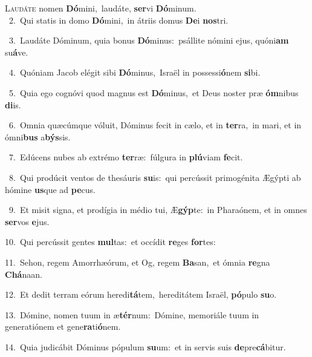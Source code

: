 \lettrine{\initial\textcolor{\initialcolor}{L}}{audáte} nomen \textbf{Dó}\-mini,~\star laudáte, \textbf{ser}\-vi \textbf{Dó}\-minum.\\
{\numbfont\textcolor{\numbcolor}{~2.}}~Qui statis in domo \textbf{Dó}\-mini,~\star in átriis domus \textbf{De}\-i \textbf{nos}\-tri.\par
{\numbfont\textcolor{\numbcolor}{~3.}}~Laudáte Dóminum, quia bonus \textbf{Dó}\-minus:~\star psállite nómini ejus, quóni\textbf{am} su\-\textbf{á}\-ve.\par
{\numbfont\textcolor{\numbcolor}{~4.}}~Quóniam Jacob elégit sibi \textbf{Dó}\-minus,~\star Israël in possessi\-\textbf{ó}\-nem \textbf{si}\-bi.\par
{\numbfont\textcolor{\numbcolor}{~5.}}~Quia ego cognóvi quod magnus est \textbf{Dó}\-minus,~\star et Deus noster præ \textbf{óm}\-nibus \textbf{di}\-is.\par
{\numbfont\textcolor{\numbcolor}{~6.}}~Omnia quæcúmque vóluit, Dóminus fecit in cælo, et in \textbf{ter}\-ra,~\star in mari, et in ómni\textbf{bus} a\-\textbf{býs}\-sis.\par
{\numbfont\textcolor{\numbcolor}{~7.}}~Edúcens nubes ab extrémo \textbf{ter}\-ræ:~\star fúlgura in \textbf{plú}\-viam \textbf{fe}\-cit.\par
{\numbfont\textcolor{\numbcolor}{~8.}}~Qui prodúcit ventos de thesáuris \textbf{su}\-is:~\star qui percússit primogénita Ægýpti ab hómine \textbf{us}\-que ad \textbf{pe}\-cus.\par
{\numbfont\textcolor{\numbcolor}{~9.}}~Et misit signa, et prodígia in médio tui, Æ\-\textbf{gýp}\-te:~\star in Pharaónem, et in omnes \textbf{ser}\-vos \textbf{e}\-jus.\par
{\numbfont\textcolor{\numbcolor}{10.}}~Qui percússit gentes \textbf{mul}\-tas:~\star et occídit \textbf{re}\-ges \textbf{for}\-tes:\par
{\numbfont\textcolor{\numbcolor}{11.}}~Sehon, regem Amorrhæórum, et Og, regem \textbf{Ba}\-san,~\star et ómnia \textbf{re}\-gna \textbf{Chá}\-naan.\par
{\numbfont\textcolor{\numbcolor}{12.}}~Et dedit terram eórum heredi\-\textbf{tá}\-tem,~\star hereditátem Israël, \textbf{pó}\-pulo \textbf{su}\-o.\par
{\numbfont\textcolor{\numbcolor}{13.}}~Dómine, nomen tuum in æ\-\textbf{tér}\-num:~\star Dómine, memoriále tuum in generatiónem et gene\-\textbf{ra}\-ti\-\textbf{ó}\-nem.\par
{\numbfont\textcolor{\numbcolor}{14.}}~Quia judicábit Dóminus pópulum \textbf{su}\-um:~\star et in servis suis \textbf{de}\-pre\-\textbf{cá}\-bitur.\par
